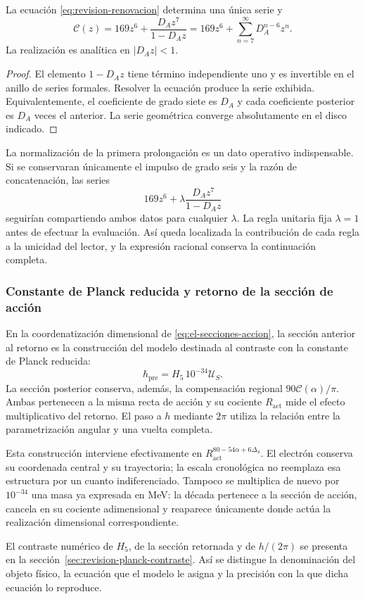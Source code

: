\begin{proposition}
La ecuación \eqref{eq:revision-renovacion} determina una única serie y
\[
 \mathscr C(z)=169z^6+\frac{D_Az^7}{1-D_Az}
             =169z^6+\sum_{n=7}^{\infty}D_A^{n-6}z^n.
\]
La realización es analítica en \(|D_Az|<1\).
\end{proposition}
\begin{proof}
El elemento \(1-D_Az\) tiene término independiente uno y es invertible
en el anillo de series formales. Resolver la ecuación produce la serie
exhibida. Equivalentemente, el coeficiente de grado siete es \(D_A\)
y cada coeficiente posterior es \(D_A\) veces el anterior. La serie
geométrica converge absolutamente en el disco indicado.
\end{proof}

La normalización de la primera prolongación es un dato operativo
indispensable. Si se conservaran únicamente el impulso de grado seis y
la razón de concatenación, las series
\[
 169z^6+\lambda\frac{D_Az^7}{1-D_Az}
\]
seguirían compartiendo ambos datos para cualquier \(\lambda\).
La regla unitaria fija \(\lambda=1\) antes de efectuar la evaluación.
Así queda localizada la contribución de cada regla a la unicidad del
lector, y la expresión racional conserva la continuación completa.

\subsubsection{Constante de Planck reducida y retorno de la sección de acción}

En la coordenatización dimensional de \eqref{eq:el-secciones-accion}, la sección
anterior al retorno es la construcción del modelo destinada al contraste
con la constante de Planck reducida:
\[
 \hbar_{\mathrm{pre}}=H_5\,10^{-34}\mathcal U_S.
\]
La sección posterior conserva, además, la compensación regional
\(90\mathscr C(\alpha)/\pi\). Ambas pertenecen a la misma recta de
acción y su cociente \(R_{\mathrm{act}}\) mide el efecto multiplicativo
del retorno. El paso a \(h\) mediante \(2\pi\) utiliza la relación
entre la parametrización angular y una vuelta completa.

Esta construcción interviene efectivamente en
\(R_{\mathrm{act}}^{80-54\alpha+6\Delta_4}\). El electrón conserva
su coordenada central y su trayectoria; la escala cronológica no
reemplaza esa estructura por un cuanto indiferenciado. Tampoco se
multiplica de nuevo por \(10^{-34}\) una masa ya expresada en MeV:
la década pertenece a la sección de acción, cancela en su cociente
adimensional y reaparece únicamente donde actúa la realización
dimensional correspondiente.

El contraste numérico de \(H_5\), de la sección retornada y de
\(h/(2\pi)\) se presenta en la sección~\ref{sec:revision-planck-contraste}.
Así se distingue la denominación del objeto físico, la ecuación que el
modelo le asigna y la precisión con la que dicha ecuación lo reproduce.

